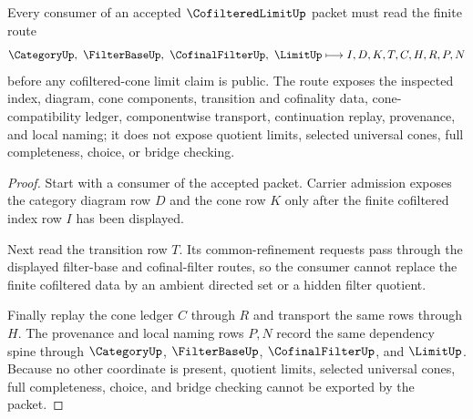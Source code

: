 \begin{theorem}
\label{thm:cofiltered-limit-cone-ledger-nonescape}
Every consumer of an accepted $\CofilteredLimitUp$ packet must read the finite route
$$
\CategoryUp,\ \FilterBaseUp,\ \CofinalFilterUp,\ \LimitUp
\longmapsto
I,D,K,T,C,H,R,P,N
$$
before any cofiltered-cone limit claim is public. The route exposes the inspected index, diagram, cone components, transition and cofinality data, cone-compatibility ledger, componentwise transport, continuation replay, provenance, and local naming; it does not expose quotient limits, selected universal cones, full completeness, choice, or bridge checking.
\end{theorem}
\begin{proof}
Start with a consumer of the accepted packet. Carrier admission exposes the category diagram row $D$ and the cone row $K$ only after the finite cofiltered index row $I$ has been displayed.

Next read the transition row $T$. Its common-refinement requests pass through the displayed filter-base and cofinal-filter routes, so the consumer cannot replace the finite cofiltered data by an ambient directed set or a hidden filter quotient.

Finally replay the cone ledger $C$ through $R$ and transport the same rows through $H$. The provenance and local naming rows $P,N$ record the same dependency spine through $\CategoryUp$, $\FilterBaseUp$, $\CofinalFilterUp$, and $\LimitUp$. Because no other coordinate is present, quotient limits, selected universal cones, full completeness, choice, and bridge checking cannot be exported by the packet.
\end{proof}




